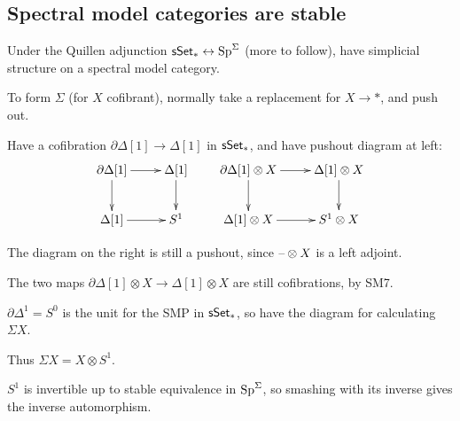 \begin{MichaelStableModelCats}
\subsection*{Spectral model categories are stable}
\begin{itemise}
\item Under the Quillen adjunction $\operatorname{{\mathsf{sSet}}}_*\leftrightarrow\operatorname{Sp}^\Sigma$ (more to follow), have simplicial structure on a spectral model category.
\item To form $\Sigma$ (for $X$ cofibrant), normally take a replacement for $X\to \ast$, and push out. 
\begin{itemise}
\item Have a cofibration $\partial\Delta[1]\to\Delta[1]$ in $\operatorname{{\mathsf{sSet}}}_*$, and have pushout diagram at left:
\[\xymatrix{
\partial\Delta[1]\ar[r]\ar[d]&\Delta[1]\ar[d]\\
\Delta[1]\ar[r]&S^1
}\qquad\xymatrix{
\partial\Delta[1]\otimes X\ar[r]\ar[d]&\Delta[1]\otimes X\ar[d]\\
\Delta[1]\otimes X\ar[r]&S^1\otimes X
}\]
\item The diagram on the right is still a pushout, since $\textup{--}\otimes X$ is a left adjoint. 
\item The two maps $\partial\Delta[1]\otimes X\to\Delta[1]\otimes X$ are still cofibrations, by SM7. 
\item $\partial\Delta^1=S^0$ is the unit for the SMP in $\operatorname{{\mathsf{sSet}}}_*$, so have the diagram for calculating $\Sigma X$.
\item Thus $\Sigma X=X\otimes S^1$.
\end{itemise}
\item $S^1$ is invertible up to stable equivalence in $\operatorname{Sp}^\Sigma$, so smashing with its inverse gives the inverse automorphism.
\end{itemise}

\end{MichaelStableModelCats}
